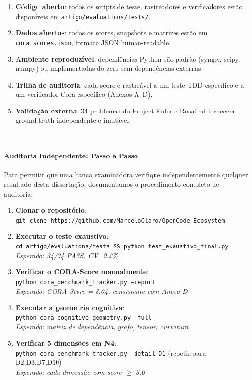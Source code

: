\begin{enumerate}[label=(\roman*)]
\item \textbf{Código aberto}: todos os scripts de teste, rastreadores e
      verificadores estão disponíveis em
      \texttt{artigo/evaluations/tests/}.
\item \textbf{Dados abertos}: todos os scores, snapshots e matrizes estão em
      \texttt{cora\_scores.json}, formato JSON human-readable.
\item \textbf{Ambiente reproduzível}: dependências Python são padrão
      (sympy, scipy, numpy) ou implementadas do zero sem dependências externas.
\item \textbf{Trilha de auditoria}: cada score é rastreável a um teste TDD
      específico e a um verificador Cora específico (Anexos A--D).
\item \textbf{Validação externa}: 34 problemas do Project Euler e Rosalind
      fornecem ground truth independente e imutável.
\end{enumerate}

\\\paragraph{Auditoria Independente: Passo a Passo}

Para permitir que uma banca examinadora verifique independentemente qualquer
resultado desta dissertação, documentamos o procedimento completo de auditoria:

\begin{enumerate}[label=\textbf{Passo \arabic*}:,leftmargin=*]
\item \textbf{Clonar o repositório}: \\
      \texttt{git clone https://github.com/MarceloClaro/OpenCode\_Ecosystem}
\item \textbf{Executar o teste exaustivo}: \\
      \texttt{cd artigo/evaluations/tests \&\& python test\_exaustivo\_final.py} \\
      \textit{Esperado: 34/34 PASS, CV=2.2\%}
\item \textbf{Verificar o CORA-Score manualmente}: \\
      \texttt{python cora\_benchmark\_tracker.py --report} \\
      \textit{Esperado: CORA-Score = 3.04, consistente com Anexo D}
\item \textbf{Executar a geometria cognitiva}: \\
      \texttt{python cora\_cognitive\_geometry.py --full} \\
      \textit{Esperado: matriz de dependência, grafo, tensor, curvatura}
\item \textbf{Verificar 5 dimensões em N4}: \\
      \texttt{python cora\_benchmark\_tracker.py --detail D1} (repetir para D2,D3,D7,D10) \\
      \textit{Esperado: cada dimensão com score $\geq$ 3.0}
\end{enumerate}

